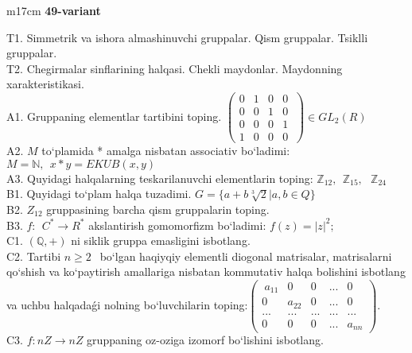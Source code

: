\documentclass{article}
\begin{document}
\begin{tabular}{m{17cm}}
\textbf{49-variant}
\newline

T1. Simmetrik va ishora almashinuvchi gruppalar. Qism gruppalar. Tsiklli gruppalar. \\
T2. Chegirmalar sinflarining halqasi. Chekli maydonlar. Maydonning xarakteristikasi. \\
A1. Gruppaning elementlar tartibini toping. \(\left( \begin{matrix}
0 & 1 & 0 & 0 \\
0 & 0 & 1 & 0 \\
0 & 0 & 0 & 1 \\
1 & 0 & 0 & 0
\end{matrix}\  \right) \in GL_{2}(R)\) \\
A2. \(M\) to`plamida * amalga nisbatan associativ bo`ladimi: \(M\mathbb{= N},\ \ x*y = EKUB(x,y)\) \\
A3. Quyidagi halqalarning teskarilanuvchi elementlarin toping: \(\mathbb{Z}_{12},\ \ \mathbb{Z}_{15},\ \ \ \mathbb{Z}_{24}\) \\
B1. Quyidagi to`plam halqa tuzadimi. \(G = \{ a + b\sqrt[3]{2}|a,b \in Q\}\) \\
B2. \(Z_{12}\) gruppasining barcha qism gruppalarin toping. \\
B3. \(f:\ \ C^{*} \rightarrow R^{*}\) akslantirish gomomorfizm bo`ladimi: \(f(z) = |z|^{2};\) \\
C1. \((\mathbb{Q}, + )\) ni siklik gruppa emasligini isbotlang. \\
C2. Tartibi \(n \geq 2\ \ \) bo`lgan haqiyqiy elementli diogonal matrisalar, matrisalarni qo`shish va ko`paytirish amallariga nisbatan kommutativ halqa bolishini isbotlang va uchbu halqadaǵi nolning bo`luvchilarin toping:\(\begin{pmatrix}
\ a_{11} & 0\ \  & 0 & ... & 0\ \  \\
0\ \  & a_{22} & 0 & ... & 0\ \  \\
... & ... & ... & ... & ... \\
0\ \  & 0\ \  & 0 & ... & a_{nn}
\end{pmatrix}.\) \\
C3. \(f:nZ \rightarrow nZ\) gruppaning o\textquotesingle z-o\textquotesingle ziga izomorf bo`lishini isbotlang. \\

\end{tabular}
\vspace{1cm}
\end{document}
